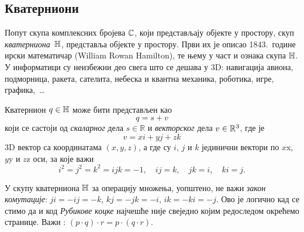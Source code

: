 \subsection{Кватерниони}

\def\uv{{u}}
\def\vp{{v}}
\def\norm#1{{\vert#1\vert}}
\def\con#1{{\bar#1}}

Попут скупа комплексних бројева ${\mathbb C}$, који представљају објекте у  простору,
скуп {\sl кватерниона\/}~${\mathbb H}$, представља објекте у  простору. 
Први их је описао 1843.\ године ирски математичар
 (William Rowan Hamilton), те њему у част и ознака скупа
${\mathbb H}$.
У информатици су неизбежни део свега што се дешава у 3D:
навигација авиона, подморница, ракета, сателита,
небеска и квантна механика, роботика, игре, графика,~\dots

\medskip

Кватернион $q\in{\mathbb H}$ може бити представљен као 
\begin{equation}
    q=s+\vp
\end{equation}
који се састоји од {\sl скаларног\/} дела $s\in{\mathbb R}$ и {\sl векторског\/} дела 
$\vp\in\Rset^3$, где је
\begin{equation}
    \vp=xi+yj+zk
\end{equation}
3D вектор са координатама $(x,y,z)$, 
а где су $i$, $j$ и $k$ јединични вектори 
по $x$\idxaxis x, $y$\idxaxis y и $z$\idxaxis z оси, за које важи
\begin{equation}\label{eq:qunits}
    i^2=j^2=k^2=ijk=-1,\quad
    ij=k,\quad jk=i,\quad ki=j. 
\end{equation}

\danger 
У скупу кватерниона ${\mathbb H}$ за операцију множења, уопштено, не важи {\sl закон комутације}:
$ji=-ij=-k$, $kj=-jk=-i$, $ik=-ki=-j$.
Ово је логично кад се стимо да и код
{\sl Рубикове коцке\/} 
најчешће није свеједно којим редоследом окрећемо странице.
Важи {\sl {}}: $(p\cdot q)\cdot r=p\cdot(q\cdot r)$.

\medskip

